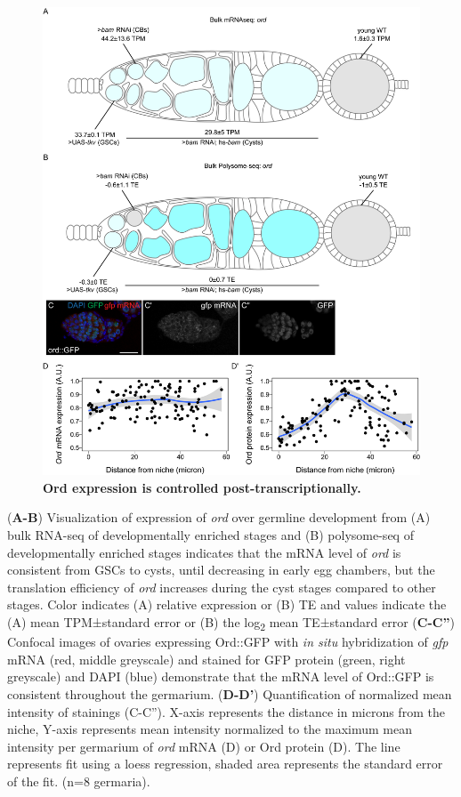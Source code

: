 \documentclass[12pt,oneside]{reedthesis}
\begin{document}
\begin{figure}

{\centering \includegraphics[width=1\linewidth]{./figure/Oo_site/Figure4} 

}

\caption[\textbf{Ord expression is controlled post-transcriptionally.}]{\textbf{Ord expression is controlled post-transcriptionally.}}\label{fig:oosite-fig-6}
\end{figure}

\setlength\parindent{0pt}(\textbf{A-B}) Visualization of expression of \emph{ord} over germline development from (A) bulk RNA-seq of developmentally enriched stages and (B) polysome-seq of developmentally enriched stages indicates that the mRNA level of \emph{ord} is consistent from GSCs to cysts, until decreasing in early egg chambers, but the translation efficiency of \emph{ord} increases during the cyst stages compared to other stages. Color indicates (A) relative expression or (B) TE and values indicate the (A) mean TPM±standard error or (B) the log\textsubscript{2} mean TE±standard error (\textbf{C-C''}) Confocal images of ovaries expressing Ord::GFP with \emph{in situ} hybridization of \emph{gfp} mRNA (red, middle greyscale) and stained for GFP protein (green, right greyscale) and DAPI (blue) demonstrate that the mRNA level of Ord::GFP is consistent throughout the germarium. (\textbf{D-D'}) Quantification of normalized mean intensity of stainings (C-C''). X-axis represents the distance in microns from the niche, Y-axis represents mean intensity normalized to the maximum mean intensity per germarium of \emph{ord} mRNA (D) or Ord protein (D). The line represents fit using a loess regression, shaded area represents the standard error of the fit. (n=8 germaria).
\end{document}
